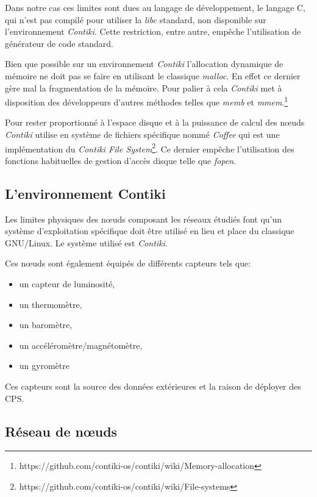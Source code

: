 Dans notre cas ces limites sont dues au langage de développement, le langage C, qui n'est pas compilé pour utiliser la \emph{libc} standard, non disponible sur l'environnement \emph{Contiki}. Cette restriction, entre autre, empêche l'utilisation de générateur de code standard.

Bien que possible sur un environnement \emph{Contiki} l'allocation dynamique de mémoire ne doit pas se faire en utilisant le classique \emph{malloc}. En effet ce dernier gère mal la fragmentation de la mémoire. Pour palier à cela \emph{Contiki} met à disposition des développeurs d'autres méthodes telles que \emph{memb} et \emph{mmem}.\footnote{https://github.com/contiki-os/contiki/wiki/Memory-allocation}

Pour rester proportionné à l'espace disque et à la puissance de calcul des nœuds \emph{Contiki} utilise en système de fichiers spécifique nommé \emph{Coffee} qui est une  implémentation du \emph{Contiki File System}\footnote{https://github.com/contiki-os/contiki/wiki/File-systems}. Ce dernier empêche l'utilisation des fonctions habituelles de gestion d'accès disque telle que \emph{fopen}.

\subsection{L'environnement Contiki}

Les limites physiques des nœuds composant les réseaux étudiés font qu'un système d'exploitation spécifique doit être utilisé en lieu et place du classique GNU/Linux. Le système utilisé est \emph{Contiki}\cite{contiki}.

Ces nœuds sont également équipés de différents capteurs tels que:
\begin{itemize}
\item un capteur de luminosité,
\item un thermomètre,
\item un baromètre,
\item un accéléromètre/magnétomètre,
\item un gyromètre
\end{itemize}

Ces capteurs sont la source des données extérieures et la raison de déployer des CPS.

\subsection{Réseau de nœuds}

